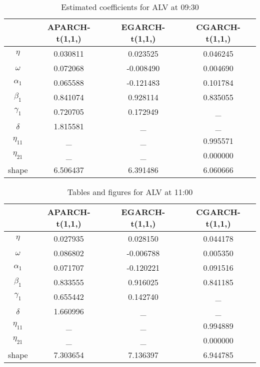 \begin{table}[!h]
 \small
  \caption{Estimated coefficients for ALV at 09:30}
  \label{coefalv930}
  \centering
  \vspace{2ex} 
\begin{tabular}{c|c|c|c}
\toprule
	&	APARCH-t(1,1,)&	EGARCH-t(1,1,)&	CGARCH-t(1,1,)\\
\midrule
\hline
$\eta$ & 0.030811&	0.023525	&0.046245\\
\hline
$\omega$ & 0.072068&	-0.008490	&0.004690\\
\hline
$\alpha_1$ & 0.065588&	-0.121483	&0.101784\\
\hline
$\beta_1$ & 0.841074&	0.928114	&0.835055\\
\hline
$\gamma_1$ & 0.720705&	0.172949	&   \_    \\
\hline
$\delta$ & 1.815581&		\_		&   \_    \\
\hline
$\eta_{11}$ & 	\_	&		\_		&0.995571\\
\hline
$\eta_{21}$ &	\_	&		\_		&0.000000\\
\hline
shape& 6.506437&	6.391486	&6.060666\\
\bottomrule

\end{tabular}
\end{table}



\begin{table}[!h]
 \small
  \caption{Tables and figures for ALV at 11:00}
  \label{coefalv1100}
  \centering
  \vspace{2ex} 
\begin{tabular}{c|c|c|c}
\toprule
	&APARCH-t(1,1,)&	EGARCH-t(1,1,)&	CGARCH-t(1,1,)\\
\midrule
\hline
$\eta$      &0.027935&	0.028150	&0.044178\\
$\omega$    &0.086802&	-0.006788	&0.005350\\
$\alpha_1$  &0.071707&	-0.120221	&0.091516\\
$\beta_1$   &0.833555&	0.916025	&0.841185\\
$\gamma_1$  &0.655442&	0.142740	&\_      \\
$\delta$    &1.660996&	\_			&\_      \\
$\eta_{11}$ &\_		&	\_			&0.994889\\
$\eta_{21}$ &\_		&	\_			&0.000000\\
shape		&7.303654&	7.136397	&6.944785\\
\bottomrule

\end{tabular}
\end{table}



